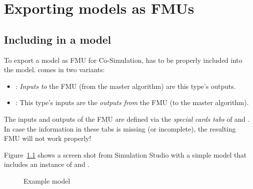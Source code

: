 \chapter{Exporting \trnsys models as FMUs}

\section{Including \type in a \trnsys model}
\label{sec:export:model}

To export a \trnsys model as FMU for Co-Simulation, \type has to be properly included into the model.
\type comes in two variants:
\begin{itemize}
  \item \textbf{\typea}: \emph{Inputs to} the FMU (from the master algorithm) are this type's outputs.
  \item \textbf{\typeb}: This type's inputs are the \emph{outputs from} the FMU (to the master algorithm).
\end{itemize}
The inputs and outputs of the FMU are defined via the \emph{special cards tabs} of \typea and \typeb. In case the information in these tabs is missing (or incomplete), the resulting FMU will not work properly!

Figure~\ref{fig:trnsys_model} shows a screen shot from Simulation Studio with a simple \trnsys model that includes an instance of \typea and \typeb.

\begin{figure}[h]
\caption{Example \trnsys model}
\label{fig:trnsys_model}
\end{figure}

